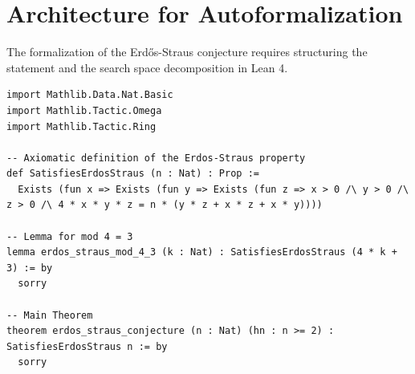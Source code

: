 \documentclass[12pt, a4paper]{article}
\begin{document}
\section{Architecture for Autoformalization}
The formalization of the Erdős-Straus conjecture requires structuring the statement and the search space decomposition in Lean 4.

\begin{lstlisting}[language=lean, basicstyle=\ttfamily\small, breaklines=true]
import Mathlib.Data.Nat.Basic
import Mathlib.Tactic.Omega
import Mathlib.Tactic.Ring

-- Axiomatic definition of the Erdos-Straus property
def SatisfiesErdosStraus (n : Nat) : Prop :=
  Exists (fun x => Exists (fun y => Exists (fun z => x > 0 /\ y > 0 /\ z > 0 /\ 4 * x * y * z = n * (y * z + x * z + x * y))))

-- Lemma for mod 4 = 3
lemma erdos_straus_mod_4_3 (k : Nat) : SatisfiesErdosStraus (4 * k + 3) := by
  sorry

-- Main Theorem
theorem erdos_straus_conjecture (n : Nat) (hn : n >= 2) : SatisfiesErdosStraus n := by
  sorry
\end{lstlisting}
\end{document}
